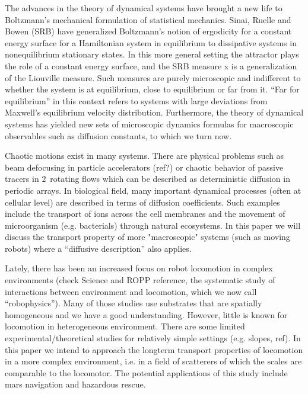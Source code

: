 \documentclass[aps,pre,
                showpacs,
                twocolumn,
                groupedaddress,
                floatfix]{revtex4-1}
\begin{document}

The advances in the theory of dynamical systems have brought a new life to
Boltzmann's mechanical formulation of statistical mechanics. Sinai, Ruelle and
Bowen (SRB) have generalized Boltzmann's notion of ergodicity for a constant
energy surface for a Hamiltonian system in equilibrium to dissipative systems in
{nonequilibrium} stationary states. In this more general setting the attractor
plays the role of a constant energy surface, and the SRB measure x is a
generalization of the Liouville measure. Such measures are purely microscopic
and indifferent to whether the system is at equilibrium, close to equilibrium or
far from it. ``Far for equilibrium'' in this context refers to systems with
large deviations from Maxwell's equilibrium velocity distribution. Furthermore,
the theory of dynamical systems has yielded new sets of microscopic dynamics
formulas for macroscopic observables such as diffusion constants, to which we
turn now.

Chaotic motions exist in many systems. There are physical problems such as beam
defocusing in particle accelerators (ref?) or chaotic behavior of passive
tracers in $2$\dmn\ rotating flows which can be described
as deterministic diffusion in periodic arrays. In biological field, many
important dynamical processes (often at cellular level) are described in terms
of diffusion coefficients. Such examples include the transport of ions across
the cell membranes and the movement of microorganism
(e.g. bacterials) through natural ecosystems. In this
paper we will discuss the transport property of more "macroscopic" systems (such
as moving robots) where a ``diffusive description'' also
applies.

Lately, there has been an increased focus on robot locomotion in complex
environments (check Science and ROPP reference, the systematic study of
interactions between environment and locomotion, which we now call
``robophysics''). Many of those studies use substrates that are spatially
homogeneous and we have a good
understanding. However, little is known
for locomotion in heterogeneous environment. There are some limited
experimental/theoretical studies for relatively simple settings (e.g. slopes,
ref). In this paper we intend to approach the longterm transport properties of
locomotion in a more complex environment, i.e. in a field of scatterers of which
the scales are comparable to the locomotor. The potential applications of this
study include mars navigation and hazardous rescue.
\end{document}
